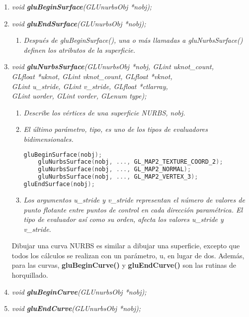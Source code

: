 \begin{enumerate}
    \item[] \emph{void \textbf{gluBeginSurface}(GLUnurbsObj *nobj);}
    \item[] \emph{void \textbf{gluEndSurface}(GLUnurbsObj *nobj);}
    \begin{enumerate}
        \item[] \textit{Después de gluBeginSurface(), una o más
            llamadas a gluNurbsSurface() definen los atributos de
            la superficie.
        }
    \end{enumerate}
    \item[] \emph{void \textbf{gluNurbsSurface}(GLUnurbsObj *nobj, GLint uknot\_count,\\
    GLfloat *uknot, GLint vknot\_count, GLfloat *vknot,\\
    GLint u\_stride, GLint v\_stride, GLfloat *ctlarray,\\
    GLint uorder, GLint vorder, GLenum type);}
    \begin{enumerate}
        \item[] \textit{Describe los vértices de una superficie NURBS, nobj.
        }
        \item[] \textit{El último parámetro, tipo, es uno de los tipos
            de evaluadores bidimensionales.
        }
\begin{lstlisting}[language=C++]
gluBeginSurface(nobj);
    gluNurbsSurface(nobj, ..., GL_MAP2_TEXTURE_COORD_2);
    gluNurbsSurface(nobj, ..., GL_MAP2_NORMAL);
    gluNurbsSurface(nobj, ..., GL_MAP2_VERTEX_3);
gluEndSurface(nobj);
\end{lstlisting}
        \item[] \textit{Los argumentos u\_stride y v\_stride representan
            el número de valores de punto flotante entre puntos de control
            en cada dirección paramétrica. El tipo de evaluador
            así como su orden, afecta los valores u\_stride y v\_stride.
        }
    \end{enumerate}
    Dibujar una curva NURBS es similar a dibujar una superficie, excepto
    que todos los cálculos se realizan con un parámetro, u, en lugar de dos.
    Además, para las curvas, \textbf{gluBeginCurve()} y \textbf{gluEndCurve()} son las
    rutinas de horquillado.
    \item[] \emph{void \textbf{gluBeginCurve}(GLUnurbsObj *nobj);}
    \item[] \emph{void \textbf{gluEndCurve}(GLUnurbsObj *nobj);}
    \begin{enumerate}

\end{enumerate}
\end{enumerate}

